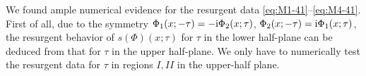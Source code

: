 \documentclass[12pt,reqno]{amsart}
\theoremstyle{definition}
\def\s{\sigma}
\def\tq{\tilde{q}}
\def\tx{\tilde{x}}
\def\ri{\mathrm{i}}
\def\tx{\tilde{x}}
\def\ri{{\rm i}}
\def\md{\mathbf}
\newcommand{\knot}[1]{\md{#1}}
\begin{document}

We found ample numerical evidence for the resurgent data
\eqref{eq:M1-41}--\eqref{eq:M4-41}.  First of all, due to the symmetry
$\Phi_{1}(x;-\tau) = -\ri \Phi_{2}(x;\tau)$,
$\Phi_{2}(x;-\tau) = \ri \Phi_{1}(x;\tau)$, the resurgent behavior of
$s(\Phi)(x;\tau)$ for $\tau$ in the lower half-plane can be deduced
from that for $\tau$ in the upper half-plane.  We only have to
numerically test the resurgent data for $\tau$ in regions $I,II$ in
the upper-half plane.
\end{document}
